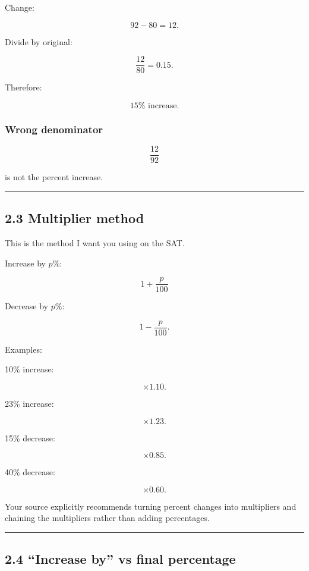 \documentclass[
]{article}
\begin{document}
Change:

\[
92-80=12.
\]

Divide by original:

\[
\frac{12}{80}=0.15.
\]

Therefore:

\[
\boxed{15\%\text{ increase}}.
\]

\subsubsection{Wrong denominator}\label{wrong-denominator}

\[
\frac{12}{92}
\]

is not the percent increase.

\begin{center}\rule{0.5\linewidth}{0.5pt}\end{center}

\subsection{2.3 Multiplier method}\label{multiplier-method}

This is the method I want you using on the SAT.

Increase by \(p\%\):

\[
\boxed{1+\frac p{100}}
\]

Decrease by \(p\%\):

\[
\boxed{1-\frac p{100}}.
\]

Examples:

10\% increase:

\[
\times1.10.
\]

23\% increase:

\[
\times1.23.
\]

15\% decrease:

\[
\times0.85.
\]

40\% decrease:

\[
\times0.60.
\]

Your source explicitly recommends turning percent changes into
multipliers and chaining the multipliers rather than adding percentages.

\begin{center}\rule{0.5\linewidth}{0.5pt}\end{center}

\subsection{2.4 ``Increase by'' vs final
percentage}\label{increase-by-vs-final-percentage}
\end{document}

